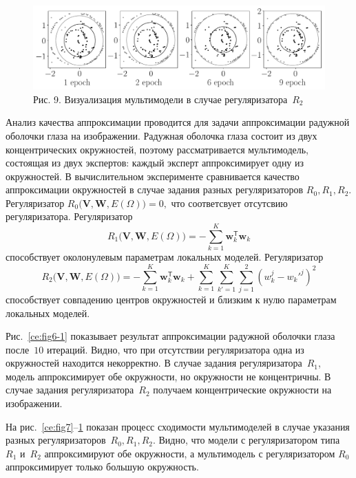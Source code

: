 \documentclass[12pt]{a&t}
\begin{document}
\begin{figure}[h!]
\begin{center}
     \includegraphics[width=\textwidth]{experiment_real_regular}
\end{center}
     \caption{Рис. 9. Визуализация мультимодели в случае регуляризатора~$R_2$}
    \label{ce:fig9}
\end{figure}

Анализ качества аппроксимации проводится для задачи аппроксимации радужной оболочки глаза на изображении. Радужная оболочка глаза состоит из двух концентрических окружностей, поэтому рассматривается мультимодель, состоящая из двух экспертов: каждый эксперт аппроксимирует одну из окружностей. В вычислительном эксперименте сравнивается качество аппроксимации окружностей в случае задания разных регуляризаторов $R_0, R_1, R_2$. Регуляризатор $R_0\bigl(\mathbf{V}, \mathbf{W}, E(\Omega)\bigr)=0,$ что соответсвует отсутсвию регуляризатора. Регуляризатор
\[
R_1\bigl(\mathbf{V}, \mathbf{W}, E(\Omega)\bigr)= -\sum_{k=1}^{K}\mathbf{w}_k^{\mathsf{T}}\mathbf{w}_k
\]
способствует околонулевым параметрам локальных моделей.
Регуляризатор
\[
R_2\bigl(\mathbf{V}, \mathbf{W}, E(\Omega)\bigr)= -\sum_{k=1}^{K}\mathbf{w}_k^{\mathsf{T}}\mathbf{w}_k + \sum_{k=1}^{K}\sum_{k'=1}^{K}\sum_{j=1}^2\left(w_k^j-w_k'^j\right)^2
\]
способствует совпадению центров окружностей и близким к нулю параметрам локальных моделей.

Рис.~\ref{ce:fig6-1} показывает результат аппроксимации радужной оболочки глаза после~$10$ итераций. Видно, что при отсутствии регуляризатора одна из окружностей находится некорректно. В случае задания регуляризатора~$R_1$, модель аппроксимирует обе окружности, но окружности не концентричны. В случае задания регуляризатора~$R_2$ получаем концентрические окружности на изображении.

На рис.~\ref{ce:fig7}--\ref{ce:fig9} показан процесс сходимости мультимоделей в случае указания разных регуляризаторов~$R_0, R_1, R_2$. Видно, что модели с регуляризатором типа~$R_1$ и~$R_2$ аппроксимируют обе окружности, а мультимодель с регуляризатором $R_0$ аппроксимирует только большую окружность.
\end{document}
